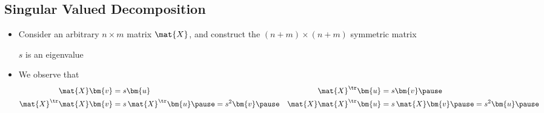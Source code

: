 \Outline %

\begin{slide}
\section[-2]{Singular Valued Decomposition}

\pb
\begin{itemize}\squeeze
\item Consider an arbitrary $n\times m$ matrix $\mat{X}$, and construct
  the $(n+m)\times(n+m)$ symmetric matrix\pauseh{}
  \vspace*{-1cm}
  \begin{center}
    \pause
  \end{center}
  \vspace*{-1cm}
  $s$ is an eigenvalue\pause
\item We observe that
  \begin{align*}
    \mat{X} \bm{v} &= s \bm{u} &
    \mat{X}^\tr \bm{u} &= s \bm{v} \pause\\
    \mat{X}^\tr \mat{X} \bm{v} &= s\,\mat{X}^\tr\bm{u} \pause = s^2 \bm{v}\pause &
    \mat{X} \mat{X}^\tr \bm{u} &= s\,\mat{X}\bm{v}\pause = s^2 \bm{u}\pause
  \end{align*}
\end{itemize}

\end{slide}


